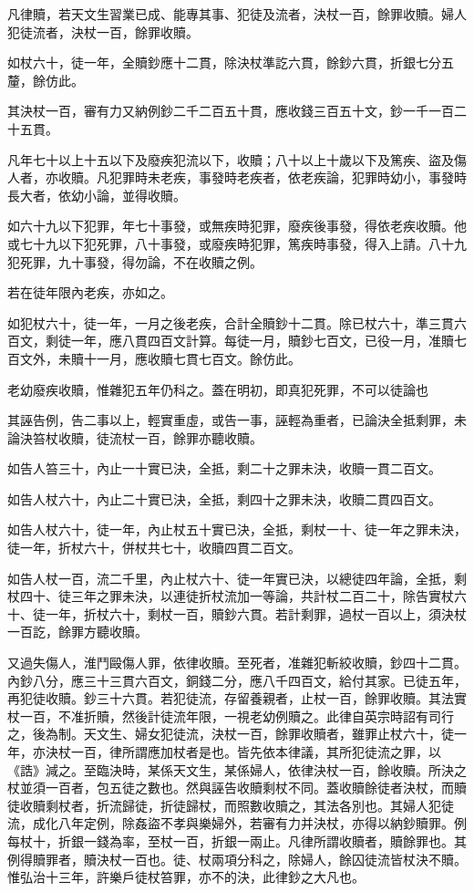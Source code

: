 凡律贖，若天文生習業已成、能專其事、犯徒及流者，決杖一百，餘罪收贖。婦人犯徒流者，決杖一百，餘罪收贖。

如杖六十，徒一年，全贖鈔應十二貫，除決杖準訖六貫，餘鈔六貫，折銀七分五釐，餘仿此。

其決杖一百，審有力又納例鈔二千二百五十貫，應收錢三百五十文，鈔一千一百二十五貫。

凡年七十以上十五以下及廢疾犯流以下，收贖；八十以上十歲以下及篤疾、盜及傷人者，亦收贖。凡犯罪時未老疾，事發時老疾者，依老疾論，犯罪時幼小，事發時長大者，依幼小論，並得收贖。

如六十九以下犯罪，年七十事發，或無疾時犯罪，廢疾後事發，得依老疾收贖。他或七十九以下犯死罪，八十事發，或廢疾時犯罪，篤疾時事發，得入上請。八十九犯死罪，九十事發，得勿論，不在收贖之例。

若在徒年限內老疾，亦如之。

如犯杖六十，徒一年，一月之後老疾，合計全贖鈔十二貫。除已杖六十，準三貫六百文，剩徒一年，應八貫四百文計算。每徒一月，贖鈔七百文，已役一月，准贖七百文外，未贖十一月，應收贖七貫七百文。餘仿此。

老幼廢疾收贖，惟雜犯五年仍科之。蓋在明初，即真犯死罪，不可以徒論也

其誣告例，告二事以上，輕實重虛，或告一事，誣輕為重者，已論決全抵剩罪，未論決笞杖收贖，徒流杖一百，餘罪亦聽收贖。

如告人笞三十，內止一十實已決，全抵，剩二十之罪未決，收贖一貫二百文。

如告人杖六十，內止二十實已決，全抵，剩四十之罪未決，收贖二貫四百文。

如告人杖六十，徒一年，內止杖五十實已決，全抵，剩杖一十、徒一年之罪未決，徒一年，折杖六十，併杖共七十，收贖四貫二百文。

如告人杖一百，流二千里，內止杖六十、徒一年實已決，以總徒四年論，全抵，剩杖四十、徒三年之罪未決，以連徒折杖流加一等論，共計杖二百二十，除告實杖六十、徒一年，折杖六十，剩杖一百，贖鈔六貫。若計剩罪，過杖一百以上，須決杖一百訖，餘罪方聽收贖。

又過失傷人，淮鬥毆傷人罪，依律收贖。至死者，准雜犯斬絞收贖，鈔四十二貫。內鈔八分，應三十三貫六百文，銅錢二分，應八千四百文，給付其家。已徒五年，再犯徒收贖。鈔三十六貫。若犯徒流，存留養親者，止杖一百，餘罪收贖。其法實杖一百，不准折贖，然後計徒流年限，一視老幼例贖之。此律自英宗時詔有司行之，後為制。天文生、婦女犯徒流，決杖一百，餘罪收贖者，雖罪止杖六十，徒一年，亦決杖一百，律所謂應加杖者是也。皆先依本律議，其所犯徒流之罪，以《誥》減之。至臨決時，某係天文生，某係婦人，依律決杖一百，餘收贖。所決之杖並須一百者，包五徒之數也。然與誣告收贖剩杖不同。蓋收贖餘徒者決杖，而贖徒收贖剩杖者，折流歸徒，折徒歸杖，而照數收贖之，其法各別也。其婦人犯徒流，成化八年定例，除姦盜不孝與樂婦外，若審有力并決杖，亦得以納鈔贖罪。例每杖十，折銀一錢為率，至杖一百，折銀一兩止。凡律所謂收贖者，贖餘罪也。其例得贖罪者，贖決杖一百也。徒、杖兩項分科之，除婦人，餘囚徒流皆杖決不贖。惟弘治十三年，許樂戶徒杖笞罪，亦不的決，此律鈔之大凡也。

